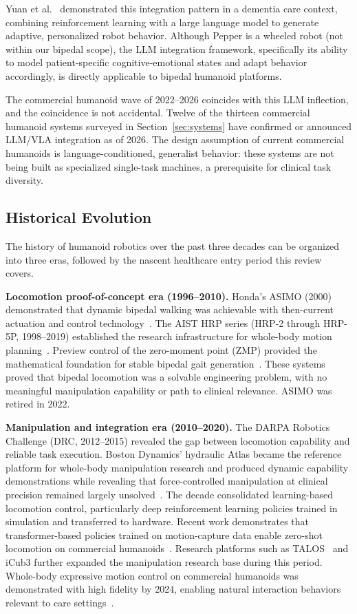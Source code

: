 \documentclass[acmjour]{acmart}
\begin{document}
Yuan et al.~\cite{yuan2025integrating} demonstrated this integration pattern in
a dementia care context, combining reinforcement learning with a large language
model to generate adaptive, personalized robot behavior. Although Pepper is a
wheeled robot (not within our bipedal scope), the LLM integration
framework, specifically its ability to model patient-specific
cognitive-emotional states and adapt behavior accordingly, is directly applicable
to bipedal humanoid platforms.

The commercial humanoid wave of 2022--2026 coincides with this LLM inflection,
and the coincidence is not accidental. Twelve of the thirteen commercial humanoid
systems surveyed in Section~\ref{sec:systems} have confirmed or announced
LLM/VLA integration as of 2026. The design assumption of current commercial
humanoids is language-conditioned, generalist behavior: these systems are not
being built as specialized single-task machines, a prerequisite for clinical
task diversity.

\subsection{Historical Evolution}
\label{sec:history}

The history of humanoid robotics over the past three decades can be organized
into three eras, followed by the nascent healthcare entry period this review
covers.

\textbf{Locomotion proof-of-concept era (1996--2010).} Honda's ASIMO (2000)
demonstrated that dynamic bipedal walking was achievable with then-current
actuation and control technology~\cite{sakagami2002asimo,cao2025humanoid}. The
AIST HRP series (HRP-2 through HRP-5P, 1998--2019) established the research
infrastructure for whole-body motion planning~\cite{kaneko2019hrp5p}. Preview
control of the zero-moment point (ZMP) provided the mathematical foundation for
stable bipedal gait generation~\cite{kajita2003biped}. These systems proved that bipedal locomotion was a
solvable engineering problem, with no meaningful manipulation capability or path
to clinical relevance. ASIMO was retired in 2022.

\textbf{Manipulation and integration era (2010--2020).} The DARPA Robotics
Challenge (DRC, 2012--2015) revealed the gap between locomotion capability and
reliable task execution. Boston Dynamics' hydraulic Atlas became the reference
platform for whole-body manipulation research and produced dynamic capability
demonstrations while revealing that force-controlled manipulation at clinical
precision remained largely unsolved~\cite{cao2025humanoid}. The decade
consolidated learning-based locomotion control, particularly deep reinforcement
learning policies trained in simulation and transferred to hardware. Recent work
demonstrates that transformer-based policies trained on motion-capture data
enable zero-shot locomotion on commercial
humanoids~\cite{radosavovic2024humanoid}. Research platforms such as
TALOS~\cite{stasse2017talos} and iCub3 further expanded the manipulation
research base during this period. Whole-body expressive motion control on
commercial humanoids was demonstrated with high fidelity by 2024, enabling
natural interaction behaviors relevant to care
settings~\cite{cheng2024expressive}.
\end{document}
